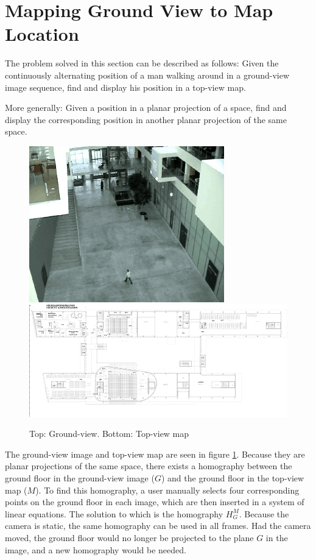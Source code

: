 \section{Mapping Ground View to Map Location}
The problem solved in this section can be described as follows:
\newline
Given the continuously alternating position of a man walking around in a
ground-view image sequence, find and display his position in a top-view map.

More generally:
\newline
Given a position in a planar projection of a space, find and display the
corresponding position in another planar projection of the same space.

\begin{figure}[!htbp]
\includegraphics{./pics/Ground.jpg}
\includegraphics{./pics/ITUMap.png}
\caption{Top: Ground-view. Bottom: Top-view map}
\label{fig:groundvsmap}
\end{figure}

The ground-view image and top-view map are seen in figure
\ref{fig:groundvsmap}. Because they are planar projections of the same space, there
exists a homography between the ground floor in the ground-view image ($G$) and the ground floor in the top-view map ($M$). To find this
homography, a user manually selects four corresponding points on the ground
floor in each image, which are then inserted in a system of linear equations. The solution
to which is the homography $H_{G}^{M}$.
Because the camera is static, the same homography can be used in all frames.
Had the camera moved, the ground floor would no longer be projected to the
plane $G$ in the image, and a new homography would be needed.

